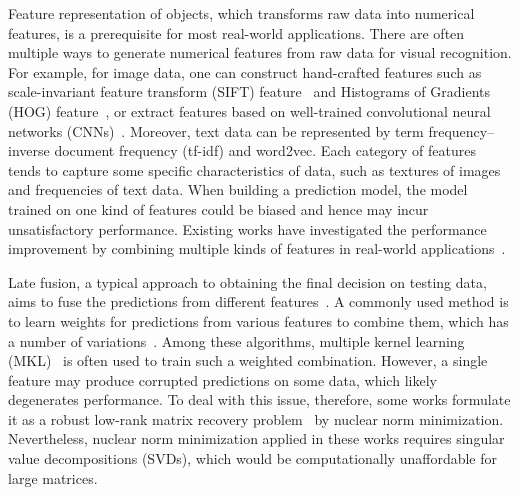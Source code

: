 \documentclass[letterpaper]{article} %
\begin{document}
Feature representation of objects, which transforms raw data into numerical features, is a prerequisite for most real-world applications.
There are often multiple ways to generate numerical features from raw data for visual recognition.
For example, for image data, one can construct hand-crafted features such as scale-invariant feature transform
(SIFT) feature~\cite{loweijcv2004distinctive} and Histograms of Gradients (HOG) feature~\cite{dalalcvpr2005histograms},
or extract features based on well-trained convolutional neural networks (CNNs)~\cite{krizhevsky2012imagenet}.
Moreover, text data can be represented by term frequency–inverse document frequency (tf-idf) and word2vec.
Each category of features tends to capture some specific characteristics of data,
such as textures of images and frequencies of text data.
When building a prediction model, the model trained on one kind of features could be biased and hence may incur unsatisfactory performance.
Existing works have investigated the performance improvement by combining multiple kinds of features in real-world applications~\cite{gehler2009feature,ye2012robust,xuiccv2013feature,lai2015learning}.


Late fusion, a typical approach to obtaining the final decision on testing data, aims to fuse the predictions from different features~\cite{ye2012robust,xuiccv2013feature,lai2015learning,vanicassp2014late}.
A commonly used method is to learn weights for predictions from various features to combine them, which has a number of variations~\cite{gehler2009feature,xuiccv2013feature,lai2015learning}.
Among these algorithms, multiple kernel learning (MKL)~\cite{lanckriet2004learning,Rakotomamonjy2008Simplemkl} is often used to train such a weighted combination.
However, a single feature may produce corrupted predictions on some data, which likely degenerates performance.
To deal with this issue, therefore, some works formulate it as a robust low-rank matrix recovery problem~\cite{gaoijcai2016robust,ye2012robust} by nuclear norm minimization.
Nevertheless, nuclear norm minimization applied in these works requires singular value decompositions (SVDs), which would be computationally unaffordable for large matrices.
\end{document}
